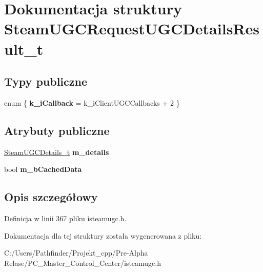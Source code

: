 \hypertarget{struct_steam_u_g_c_request_u_g_c_details_result__t}{}\section{Dokumentacja struktury Steam\+U\+G\+C\+Request\+U\+G\+C\+Details\+Result\+\_\+t}
\label{struct_steam_u_g_c_request_u_g_c_details_result__t}
\subsection*{Typy publiczne}
\begin{DoxyCompactItemize}
\item 
\mbox{\label{struct_steam_u_g_c_request_u_g_c_details_result__t_a979010a2393f5057e9697c52933f377e}} 
enum \{ {\bfseries k\+\_\+i\+Callback} = k\+\_\+i\+Client\+U\+G\+C\+Callbacks + 2
 \}
\end{DoxyCompactItemize}
\subsection*{Atrybuty publiczne}
\begin{DoxyCompactItemize}
\item 
\mbox{\label{struct_steam_u_g_c_request_u_g_c_details_result__t_ada72f6e878ce5a36c9fea199e634cc7e}} 
\hyperlink{struct_steam_u_g_c_details__t}{Steam\+U\+G\+C\+Details\+\_\+t} {\bfseries m\+\_\+details}
\item 
\mbox{\label{struct_steam_u_g_c_request_u_g_c_details_result__t_a269b81add837184f4276771127b681ba}} 
bool {\bfseries m\+\_\+b\+Cached\+Data}
\end{DoxyCompactItemize}


\subsection{Opis szczegółowy}


Definicja w linii 367 pliku isteamugc.\+h.



Dokumentacja dla tej struktury została wygenerowana z pliku\+:\begin{DoxyCompactItemize}
\item 
C\+:/\+Users/\+Pathfinder/\+Projekt\+\_\+cpp/\+Pre-\/\+Alpha Relase/\+P\+C\+\_\+\+Master\+\_\+\+Control\+\_\+\+Center/isteamugc.\+h\end{DoxyCompactItemize}
